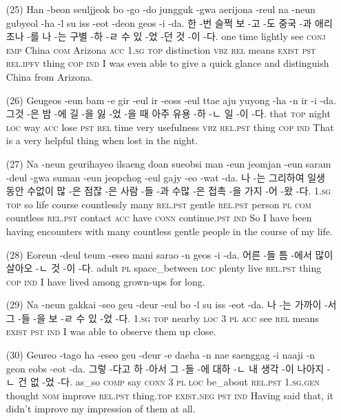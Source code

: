 \begin{itemize}
\item [(25)]
\tgl
		{Han -beon seuljjeok bo -go -do jungguk -gwa aerijona -reul na -neun gubyeol -ha -l su iss -eot -deon geos -i -da.}
		{한 -번 슬쩍 보 -고 -도 중국 -과 애리조나 -를 나 -는 구별 -하 -ㄹ 수 있 -었 -던 것 -이 -다.}
		{one	time	lightly	see	\textsc{conj}	\textsc{emp}	China	\textsc{com}	Arizona	\textsc{acc}	\textsc{1.sg}	\textsc{top}	distinction	\textsc{vbz}	\textsc{rel}	means	\textsc{exist}	\textsc{pst}	\textsc{rel.ipfv}	thing	\textsc{cop}	\textsc{ind}}
		{I was even able to give a quick glance and distinguish China from Arizona.}

\item [(26)]
\tgl
		{Geugeos -eun bam -e gir -eul ir -eoss -eul ttae aju yuyong -ha -n ir -i -da.}
		{그것 -은 밤 -에 길 -을 잃 -었 -을 때 아주 유용 -하 -ㄴ 일 -이 -다.}
		{that	\textsc{top}	night	\textsc{loc}	way	\textsc{acc}	lose	\textsc{pst}	\textsc{rel}	time	very	usefulness	\textsc{vbz}	\textsc{rel.pst}	thing	\textsc{cop}	\textsc{ind}}
		{That is a very helpful thing when lost in the night.}

\item [(27)]
\tgl
		{Na -neun geurihayeo ilsaeng doan sueobsi man -eun jeomjan -eun saram -deul -gwa suman -eun jeopchog -eul gajy -eo -wat -da.}
		{나 -는 그리하여 일생 동안 수없이 많 -은 점잖 -은 사람 -들 -과 수많 -은 접촉 -을 가지 -어 -왔 -다.}
		{\textsc{1.sg}	\textsc{top}	so	life	course	countlessly	many	\textsc{rel.pst}	gentle	\textsc{rel.pst}	person	\textsc{pl}	\textsc{com}	countless	\textsc{rel.pst}	contact	\textsc{acc}	have	\textsc{conn}	continue.\textsc{pst}	\textsc{ind}}
		{So I have been having encounters with many countless gentle people in the course of my life.}

\item [(28)]
\tgl
		{Eoreun -deul teum -eseo mani sarao -n geos -i -da.}
		{어른 -들 틈 -에서 많이 살아오 -ㄴ 것 -이 -다.}
		{adult	\textsc{pl}	space\_between	\textsc{loc}	plenty	live	\textsc{rel.pst}	thing	\textsc{cop}	\textsc{ind}}
		{I have lived among grown-ups for long.}

\pagebreak

\item [(29)]
\tgl
		{Na -neun gakkai -seo geu -deur -eul bo -l su iss -eot -da.}
		{나 -는 가까이 -서 그 -들 -을 보 -ㄹ 수 있 -었 -다.}
		{\textsc{1.sg}	\textsc{top}	nearby	\textsc{loc}	\textsc{3}	\textsc{pl}	\textsc{acc}	see	\textsc{rel}	means	\textsc{exist}	\textsc{pst}	\textsc{ind}}
		{I was able to observe them up close.}

\item [(30)]
\tgl
		{Geureo -tago ha -eseo geu -deur -e daeha -n nae saenggag -i naaji -n geon eobs -eot -da.}
		{그렇 -다고 하 -아서 그 -들 -에 대하 -ㄴ 내 생각 -이 나아지 -ㄴ 건 없 -었 -다.}
		{as\_so	\textsc{comp}	say	\textsc{conn}	\textsc{3}	\textsc{pl}	\textsc{loc}	be\_about	\textsc{rel.pst}	\textsc{1.sg.gen}	thought	\textsc{nom}	improve	\textsc{rel.pst}	thing.\textsc{top}	\textsc{exist.neg}	\textsc{pst}	\textsc{ind}}
		{Having said that, it didn't improve my impression of them at all.}


\end{itemize}
